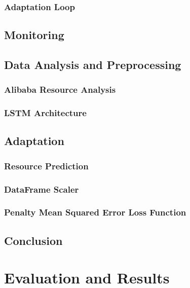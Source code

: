 \documentclass{report}
\begin{document}
      \subsection{Adaptation Loop}

    \section{Monitoring}

    \section{Data Analysis and Preprocessing}

      \subsection{Alibaba Resource Analysis}
      \subsection{LSTM Architecture}

    \section{Adaptation}
      \subsection{Resource Prediction}
      \subsection{DataFrame Scaler}
      \subsection{Penalty Mean Squared Error Loss Function}
    \section{Conclusion}

  \chapter{Evaluation and Results}

\end{document}
